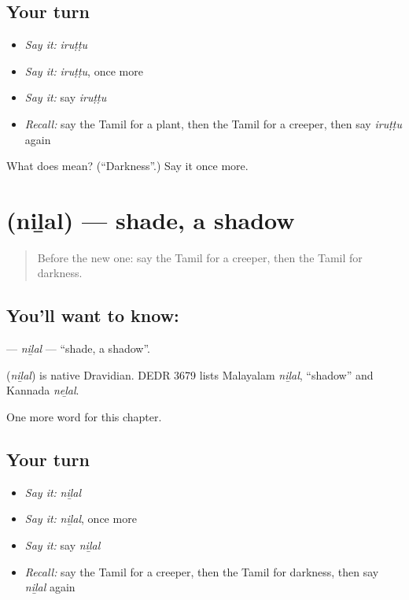 \subsection*{Your turn}
\begin{itemize}
\raggedright
  \item \emph{Say it:} \emph{iruṭṭu}
  \item \emph{Say it:} \emph{iruṭṭu}, once more
  \item \emph{Say it:} say \emph{iruṭṭu}
  \item \emph{Recall:} say the Tamil for a plant, then the Tamil for a creeper, then say \emph{iruṭṭu} again
\end{itemize}

\begin{tcolorbox}[breakable,colback=teal!4,colframe=teal!35!black,title={Before you move on}]
What does  mean? (\textquotedblleft{}Darkness\textquotedblright{}.) Say it once more.
\end{tcolorbox}
\section[\texorpdfstring{\ta{நிழல்} (niḻal)}{நிழல் (niḻal)}]{ (niḻal) — shade, a shadow}

\label{lesson:TA-C276-nilal}



\begin{quote}
Before the new one: say the Tamil for a creeper, then the Tamil for darkness.
\end{quote}

\subsection*{You'll want to know: }
\textbf{} — \emph{niḻal} — \textquotedblleft{}shade, a shadow\textquotedblright{}.

\begin{cousinweb}
\textbf{} (\emph{niḻal}) is native Dravidian. DEDR 3679 lists Malayalam \emph{niḻal}, \textquotedblleft{}shadow\textquotedblright{} and Kannada \emph{neḻal}.
\end{cousinweb}

\begin{grammarlens}[title={What you've built}]
One more word for this chapter.
\end{grammarlens}

\subsection*{Your turn}
\begin{itemize}
\raggedright
  \item \emph{Say it:} \emph{niḻal}
  \item \emph{Say it:} \emph{niḻal}, once more
  \item \emph{Say it:} say \emph{niḻal}
  \item \emph{Recall:} say the Tamil for a creeper, then the Tamil for darkness, then say \emph{niḻal} again
\end{itemize}

